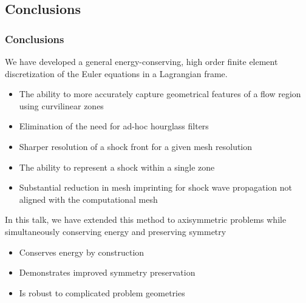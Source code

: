 \documentclass[notes=hide,8pt,xcolor=svgnames]{beamer}
\begin{document}
\subsection{Conclusions}

\begin{frame}
\frametitle{Conclusions}
We have developed a general energy-conserving, high order finite element discretization of the Euler equations in a Lagrangian frame.
\medskip

\begin{itemize}
\item The ability to more accurately capture geometrical features of a flow
region using curvilinear zones
\item Elimination of the need for ad-hoc hourglass filters
\item Sharper resolution of a shock front for a given mesh resolution
\item The ability to represent a shock within a single zone
\item Substantial reduction in mesh imprinting for
shock wave propagation not aligned with the computational mesh
\end{itemize}

\bigskip
In this talk, we have extended this method to axisymmetric problems while simultaneously conserving energy and preserving symmetry
\medskip

\begin{itemize}
\item Conserves energy by construction
\item Demonstrates improved symmetry preservation
\item Is robust to complicated problem geometries
\end{itemize}
\end{frame}
\end{document}
